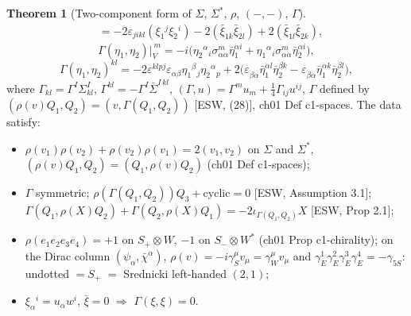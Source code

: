 \documentclass[11pt]{article}
\theoremstyle{definition}
\newtheorem{theorem}[definition]{Theorem}
\begin{document}
\begin{theorem}[Two-component form of $\Sigma$, $\Sigma^*$, $\rho$, $(-,-)$, $\Gamma$]
\begin{equation}
\begin{aligned}
&=-2\varepsilon_{jikl}(\xi_1{}^j\xi_2{}^i)-2(\bar\xi_{1k}\bar\xi_{2l})+2(\bar\xi_{1l}\bar\xi_{2k}),\end{aligned}
\end{equation}
\begin{equation}\tag{G3}
\Gamma(\eta_1,\eta_2)\big|_V^{\,m}=-i\big(\eta_2{}^\alpha{}_i\sigma^m_{\alpha\dot\alpha}\bar\eta_1^{\dot\alpha i}+\eta_1{}^\alpha{}_i\sigma^m_{\alpha\dot\alpha}\bar\eta_2^{\dot\alpha i}\big),
\end{equation}
\begin{equation}\tag{G4}
\Gamma(\eta_1,\eta_2)^{kl}=-2\varepsilon^{klpj}\varepsilon_{\alpha\beta}\eta_1{}^\beta{}_j\eta_2{}^\alpha{}_p+2\big(\varepsilon_{\dot\beta\dot\alpha}\bar\eta_1^{\dot\alpha l}\bar\eta_2^{\dot\beta k}-\varepsilon_{\dot\beta\dot\alpha}\bar\eta_1^{\dot\alpha k}\bar\eta_2^{\dot\beta l}\big),
\end{equation}
where $\Gamma_{kl}=\Gamma^I\Sigma^I_{kl}$, $\Gamma^{kl}=-\Gamma^I\bar\Sigma^{I\,kl}$, $(\Gamma,u)=\Gamma^mu_m+\tfrac14\Gamma_{ij}u^{ij}$, $\Gamma$ defined by $(\rho(v)Q_1,Q_2)=(v,\Gamma(Q_1,Q_2))$ [ESW, (28)], ch01 Def c1-spaces. The data satisfy:
\begin{itemize}
\item $\rho(v_1)\rho(v_2)+\rho(v_2)\rho(v_1)=2(v_1,v_2)$ on $\Sigma$ and $\Sigma^*$, $(\rho(v)Q_1,Q_2)=(Q_1,\rho(v)Q_2)$ (ch01 Def c1-spaces);
\item $\Gamma$ symmetric; $\rho(\Gamma(Q_1,Q_2))Q_3+\mathrm{cyclic}=0$ [ESW, Assumption 3.1]; $\Gamma(Q_1,\rho(X)Q_2)+\Gamma(Q_2,\rho(X)Q_1)=-2\iota_{\Gamma(Q_1,Q_2)}X$ [ESW, Prop 2.1];
\item $\rho(e_1e_2e_3e_4)=+1$ on $S_+\otimes W$, $-1$ on $S_-\otimes W^*$ (ch01 Prop c1-chirality); on the Dirac column $(\psi_\alpha,\bar\chi^{\dot\alpha})$, $\rho(v)=-i\gamma_S^\mu v_\mu=\gamma_W^\mu v_\mu$ and $\gamma_E^1\gamma_E^2\gamma_E^3\gamma_E^4=-\gamma_{5S}$: undotted $=S_+$ $=$ Srednicki left-handed $(2,1)$;
\item $\xi_\alpha{}^i=u_\alpha w^i$, $\bar\xi=0$ $\Rightarrow$ $\Gamma(\xi,\xi)=0$.
\end{itemize}
\end{theorem}
\end{document}
